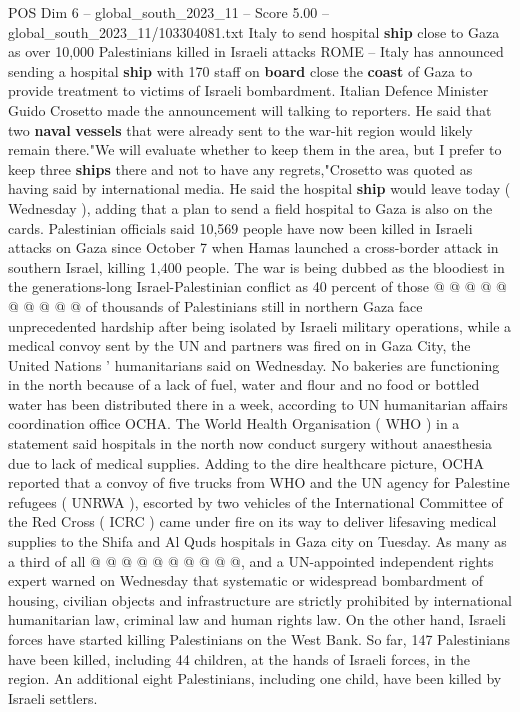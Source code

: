\begin{textsample}{POS Dim 6 – global\_south\_2023\_11 – Score 5.00 – global\_south\_2023\_11/103304081.txt}  \label{ex:f6_pos_255}
Italy to send hospital \textbf{ship} close to Gaza as over 10,000 Palestinians killed in Israeli attacks ROME -- Italy has announced sending a hospital \textbf{ship} with 170 staff on \textbf{board} close the \textbf{coast} of Gaza to provide treatment to victims of Israeli bombardment.
Italian Defence Minister Guido Crosetto made the announcement will talking to reporters.
He said that two \textbf{naval} \textbf{vessels} that were already sent to the war-hit region would likely remain there."We will evaluate whether to keep them in the area, but I prefer to keep three \textbf{ships} there and not to have any regrets,"Crosetto was quoted as having said by international media.
He said the hospital \textbf{ship} would leave today ( Wednesday ), adding that a plan to send a field hospital to Gaza is also on the cards.
Palestinian officials said 10,569 people have now been killed in Israeli attacks on Gaza since October 7 when Hamas launched a cross-border attack in southern Israel, killing 1,400 people.
The war is being dubbed as the bloodiest in the generations-long Israel-Palestinian conflict as 40 percent of those @ @ @ @ @ @ @ @ @ @ of thousands of Palestinians still in northern Gaza face unprecedented hardship after being isolated by Israeli military operations, while a medical convoy sent by the UN and partners was fired on in Gaza City, the United Nations ' humanitarians said on Wednesday.
No bakeries are functioning in the north because of a lack of fuel, water and flour and no food or bottled water has been distributed there in a week, according to UN humanitarian affairs coordination office OCHA.
The World Health Organisation ( WHO ) in a statement said hospitals in the north now conduct surgery without anaesthesia due to lack of medical supplies.
Adding to the dire healthcare picture, OCHA reported that a convoy of five trucks from WHO and the UN agency for Palestine refugees ( UNRWA ), escorted by two vehicles of the International Committee of the Red Cross ( ICRC ) came under fire on its way to deliver lifesaving medical supplies to the Shifa and Al Quds hospitals in Gaza city on Tuesday.
As many as a third of all @ @ @ @ @ @ @ @ @ @, and a UN-appointed independent rights expert warned on Wednesday that systematic or widespread bombardment of housing, civilian objects and infrastructure are strictly prohibited by international humanitarian law, criminal law and human rights law.
On the other hand, Israeli forces have started killing Palestinians on the West Bank.
So far, 147 Palestinians have been killed, including 44 children, at the hands of Israeli forces, in the region.
An additional eight Palestinians, including one child, have been killed by Israeli settlers.

\end{textsample}
